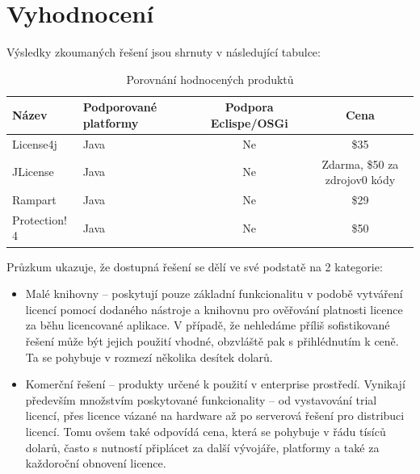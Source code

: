 \section{Vyhodnocení}
Výsledky zkoumaných řešení jsou shrnuty v následující tabulce:

\begin{table}\centering
	\caption[Results]{Porovnání hodnocených produktů}\label{tab:research-results}
	\begin{tabular}{|l|l|c|c|}\hline
		Název			& Podporované platformy	& Podpora Eclispe/OSGi	& Cena
		\tabularnewline \hline \hline 
		License4j		& Java					& Ne					& \$35		
		\tabularnewline \hline
		JLicense		& Java					& Ne					& Zdarma, \$50 za zdrojov0 kódy
		\tabularnewline \hline
		Rampart			& Java					& Ne					& \$29
		\tabularnewline \hline
		Protection! 4	& Java					& Ne					& \$50
		\tabularnewline \hline
	\end{tabular}
\end{table}

Průzkum ukazuje, že dostupná řešení se dělí ve své podstatě na 2 kategorie:

\begin{itemize}
  \item Malé knihovny – poskytují pouze základní funkcionalitu v podobě
  vytváření licencí pomocí dodaného nástroje a knihovnu pro ověřování platnosti
  licence za běhu licencované aplikace. V případě, že nehledáme příliš
  sofistikované řešení může být jejich použití vhodné, obzvláště pak s
  přihlédnutím k ceně. Ta se pohybuje v rozmezí několika desítek dolarů.
  \item Komerční řešení – produkty určené k použití v enterprise prostředí.
  Vynikají především množstvím poskytované funkcionality – od vystavování trial
  licencí, přes licence vázané na hardware až po serverová řešení pro distribuci
  licencí. Tomu ovšem také odpovídá cena, která se pohybuje v řádu tísíců
  dolarů, často s nutností připlácet za další vývojáře, platformy a také za
  každoroční obnovení licence.
\end{itemize}


% 
% 
% 
% 
% 


